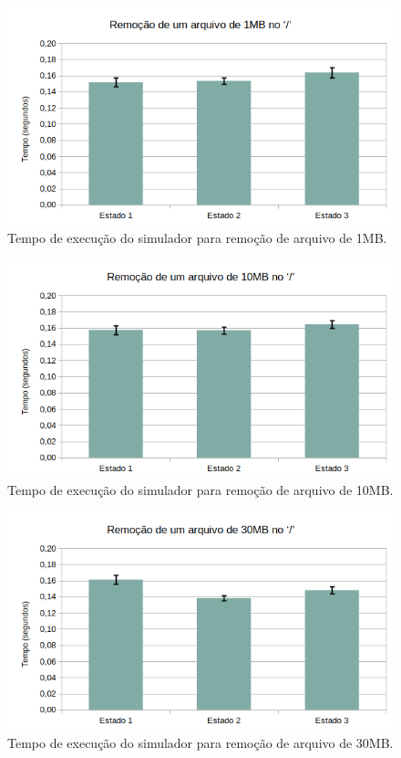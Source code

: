\documentclass[12pt]{article}
\begin{document}
\begin{figure}[H]
	\centering
	\includegraphics[width=1\textwidth]{case4.png}
	\caption{Tempo de execução do simulador para remoção de arquivo de 1MB.}
	\label{fig:case4}
\end{figure}

\begin{figure}[H]
	\centering
	\includegraphics[width=1\textwidth]{case5.png}
	\caption{Tempo de execução do simulador para remoção de arquivo de 10MB.}
	\label{fig:case5}
\end{figure}

\begin{figure}[H]
	\centering
	\includegraphics[width=1\textwidth]{case6.png}
	\caption{Tempo de execução do simulador para remoção de arquivo de 30MB.}
	\label{fig:case6}
\end{figure}
\end{document}
